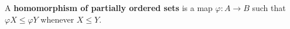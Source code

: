 A \textbf{homomorphism of partially ordered sets} is a map $\varphi: A \rightarrow B$ such that $\varphi X \leq \varphi Y$ whenever $X \leq Y$.
